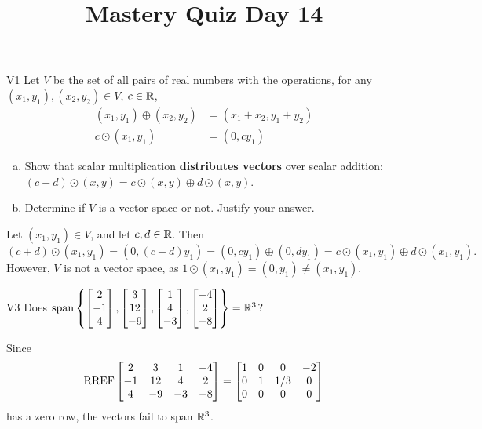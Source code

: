 \documentclass{sbgLAquiz}
\title{Mastery Quiz Day 14 }
\begin{document}
\begin{problem}{V1}
Let $V$ be the set of all pairs of real numbers with the operations, for any $(x_1,y_1), (x_2,y_2) \in V$, $c \in \mathbb{R}$,
\begin{align*}
(x_1,y_1) \oplus (x_2,y_2) &= (x_1+x_2,y_1+y_2) \\
c \odot (x_1,y_1) &= (0, cy_1)
\end{align*}
\begin{enumerate}[(a)]
\item Show that scalar multiplication
      \textbf{distributes vectors} over scalar addition:
      \((c+d)\odot(x,y)=
      c\odot(x,y) \oplus d\odot(x,y)\).
\item Determine if $V$ is a vector space or not.  Justify your answer.
\end{enumerate}
\end{problem}
\begin{solution}
Let $(x_1,y_1) \in V$, and let $c,d \in \mathbb{R}$.  Then
$$(c+d)\odot (x_1,y_1)=(0, (c+d)y_1) = (0,cy_1) \oplus (0,dy_1) = c \odot (x_1,y_1) \oplus d \odot (x_1,y_1).$$
However, $V$ is not a vector space, as $1 \odot (x_1,y_1) = (0,y_1) \neq (x_1,y_1)$.
\end{solution}


\begin{problem}{V3}
Does
\(
  \operatorname{span}\left\{
    \begin{bmatrix} 2 \\ -1 \\ 4 \end{bmatrix},
    \begin{bmatrix} 3 \\ 12 \\ -9 \end{bmatrix},
    \begin{bmatrix} 1 \\ 4 \\ -3 \end{bmatrix},
    \begin{bmatrix} -4 \\ 2 \\ -8 \end{bmatrix}
  \right\} = \mathbb{R}^3
\)?
\end{problem}
\begin{solution}
Since
\[
  \operatorname{RREF}\begin{bmatrix}
    2 & 3 & 1 & -4 \\
    -1 & 12 & 4 & 2 \\
    4 & -9 & -3 & -8
  \end{bmatrix} =
  \begin{bmatrix}
    1 & 0 & 0 & -2 \\
    0 & 1 & 1/3 & 0 \\
    0 & 0 & 0 & 0
  \end{bmatrix}
\]
has a zero row, the vectors fail to span \(\mathbb{R}^3\).
\end{solution}
\end{document}

